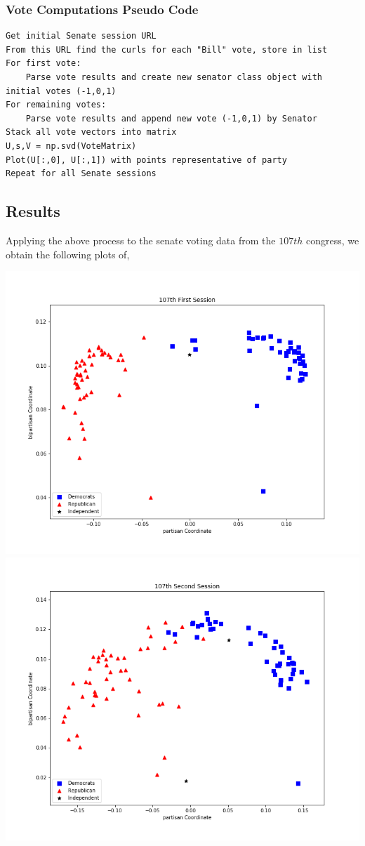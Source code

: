 \documentclass[letterpaper,12pt]{article}
\begin{document}
\subsubsection{Vote Computations Pseudo Code}
\begin{verbatim}
Get initial Senate session URL
From this URL find the curls for each "Bill" vote, store in list
For first vote:
    Parse vote results and create new senator class object with initial votes (-1,0,1)
For remaining votes:
    Parse vote results and append new vote (-1,0,1) by Senator
Stack all vote vectors into matrix
U,s,V = np.svd(VoteMatrix)
Plot(U[:,0], U[:,1]) with points representative of party
Repeat for all Senate sessions
\end{verbatim}
\subsection{Results}
Applying the above process to the senate voting data from the $107th$ congress, we obtain the following plots of,
\begin{center}
\includegraphics[scale=.4]{107th1.png}
\includegraphics[scale=.4]{107th2.png}
\end{center}
\end{document}
